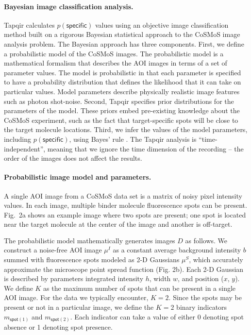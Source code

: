 \paragraph{Bayesian image classification analysis.}
Tapqir calculates $p(\mathsf{specific})$ values using an objective image classification method built on a rigorous Bayesian statistical approach to the CoSMoS image analysis problem. The Bayesian approach has three components. First, we define a probabilistic model of the CoSMoS images. The probabilistic model is a mathematical formalism that describes the AOI images in terms of a set of parameter values.  The model is probabilistic in that each parameter is specified to have a probability distribution that defines the likelihood that it can take on particular values. Model parameters describe physically realistic image features such as photon shot-noise. Second, Tapqir specifies prior distributions for the parameters of the model. These priors embed pre-existing knowledge about the CoSMoS experiment, such as the fact that target-specific spots will be close to the target molecule locations. Third, we infer the values of the model parameters, including $p(\mathsf{specific})$, using Bayes' rule \cite{Bishop2006-oa}. The Tapqir analysis is “time-independent”, meaning that we ignore the time dimension of the recording -- the order of the images does not affect the results.


\paragraph{Probabilistic image model and parameters.} %
A single AOI image from a CoSMoS data set is a matrix of noisy pixel intensity values.  In each image, multiple binder molecule fluorescence spots can be present. Fig.~2a shows an example image where two spots are present; one spot is located near the target molecule at the center of the image and another is off-target. 

The probabilistic model mathematically generates images $D$ as follows.  We construct a noise-free AOI image $\mu^I$ as a constant average background intensity $b$ summed with fluorescence spots modeled as 2-D Gaussians $\mu^S$, which accurately approximate the microscope point spread function \cite{Zhang2007-rb} (Fig. 2b). Each 2-D Gaussian is described by parameters integrated intensity $h$, width $w$, and position ($x$, $y$). We define $K$ as the maximum number of spots that can be present in a single AOI image.  For the data we typically encounter, $K = 2$. Since the spots may be present or not in a particular image, we define the $K = 2$ binary indicators $m_{\mathsf{spot}(1)}$ and $m_{\mathsf{spot}(2)}$.  Each indicator can take a value of either 0 denoting spot absence or 1 denoting spot presence. 

